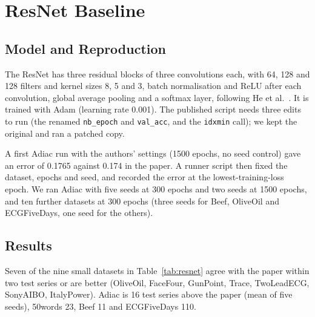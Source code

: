 \documentclass[conference]{IEEEtran}
\begin{document}
\section{ResNet Baseline}\label{sec:resnet}
\subsection{Model and Reproduction}
The ResNet has three residual blocks of three convolutions each, with 64, 128 and 128 filters and kernel sizes 8, 5 and 3, batch normalisation and ReLU after each convolution, global average pooling and a softmax layer, following He et al.~\cite{he2015}. It is trained with Adam (learning rate 0.001). The published script needs three edits to run (the renamed \texttt{nb\_epoch} and \texttt{val\_acc}, and the \texttt{idxmin} call); we kept the original and ran a patched copy.

A first Adiac run with the authors' settings (1500 epochs, no seed control) gave an error of 0.1765 against 0.174 in the paper. A runner script then fixed the dataset, epochs and seed, and recorded the error at the lowest-training-loss epoch. We ran Adiac with five seeds at 300 epochs and two seeds at 1500 epochs, and ten further datasets at 300 epochs (three seeds for Beef, OliveOil and ECGFiveDays, one seed for the others).

\subsection{Results}
Seven of the nine small datasets in Table~\ref{tab:resnet} agree with the paper within two test series or are better (OliveOil, FaceFour, GunPoint, Trace, TwoLeadECG, SonyAIBO, ItalyPower). Adiac is 16 test series above the paper (mean of five seeds), 50words 23, Beef 11 and ECGFiveDays 110.
\end{document}
